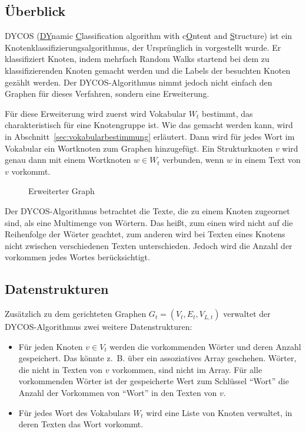 \subsection{Überblick}
DYCOS (\underline{DY}namic \underline{C}lassification 
algorithm with c\underline{O}ntent and \underline{S}tructure) ist ein 
Knotenklassifizierungsalgorithmus, der Ursprünglich in \cite{aggarwal2011} vorgestellt 
wurde. Er klassifiziert Knoten, indem mehrfach Random Walks startend
bei dem zu klassifizierenden Knoten gemacht werden und die Labels
der besuchten Knoten gezählt werden. Der DYCOS-Algorithmus nimmt 
jedoch nicht einfach den Graphen für dieses Verfahren, sondern
eine Erweiterung.

Für diese Erweiterung wird zuerst wird Vokabular $W_t$ bestimmt, das 
charakteristisch für eine Knotengruppe ist. Wie das gemacht werden kann, wird in 
Abschnitt~\ref{sec:vokabularbestimmung} erläutert. Dann wird für 
jedes Wort im Vokabular ein Wortknoten zum Graphen hinzugefügt.
Ein Strukturknoten $v$ wird genau dann mit einem Wortknoten $w \in W_t$
verbunden, wenn $w$ in einem Text von $v$ vorkommt.

\begin{figure}[htp]
    \centering
    
    \caption{Erweiterter Graph}
    \label{fig:erweiterter-graph}
\end{figure}

Der DYCOS-Algorithmus betrachtet die Texte, die zu einem Knoten 
zugeornet sind, als eine
Multimenge von Wörtern. Das heißt, zum einen wird nicht auf die
Reihenfolge der Wörter geachtet, zum anderen wird bei Texten
eines Knotens nicht zwischen verschiedenen Texten unterschieden.
Jedoch wird die Anzahl der vorkommen jedes Wortes berücksichtigt.

\subsection{Datenstrukturen}
Zusätzlich zu dem gerichteten Graphen $G_t = (V_t, E_t, V_{L,t})$ 
verwaltet der DYCOS-Algorithmus zwei weitere Datenstrukturen:
\begin{itemize}
    \item Für jeden Knoten $v \in V_t$ werden die vorkommenden Wörter
          und deren Anzahl gespeichert. Das könnte z.~B. über ein 
          assoziatives Array geschehen. Wörter, die nicht in 
          Texten von $v$ vorkommen, sind nicht im Array. Für
          alle vorkommenden Wörter ist der gespeicherte Wert zum 
          Schlüssel \enquote{Wort} die Anzahl der Vorkommen von 
          \enquote{Wort} in den Texten von $v$.
    \item Für jedes Wort des Vokabulars $W_t$ wird eine Liste von 
          Knoten verwaltet, in deren Texten das Wort vorkommt.
\end{itemize}

